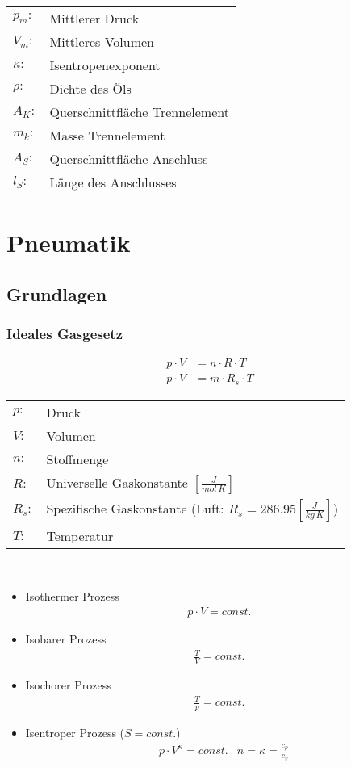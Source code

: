 \documentclass[landscape,a4paper,10pt]{article}
\begin{document}
\begin{multicols*}{3}
\begin{tabular}{ll}
$p_m:$ & Mittlerer Druck \\
$V_m:$ & Mittleres Volumen \\
$\kappa:$ & Isentropenexponent \\
$\rho:$ & Dichte des Öls \\
$A_K:$ & Querschnittfläche Trennelement \\
$m_k:$ & Masse Trennelement \\
$A_S:$ & Querschnittfläche Anschluss \\
$l_S:$ & Länge des Anschlusses
\end{tabular}







\vfill
\columnbreak
\section{Pneumatik}
\subsection{Grundlagen}
\subsubsection{Ideales Gasgesetz}
\begin{align*}
p\cdot V  &= n \cdot R \cdot T \\
p \cdot V &= m \cdot R_s \cdot T
\end{align*}
\begin{tabular}{ll}
$p:$ & Druck \\
$V:$ & Volumen \\
$n:$ & Stoffmenge \\
$R:$ & Universelle Gaskonstante $[\frac{J}{mol \, K}]$ \\
$R_s:$ & Spezifische Gaskonstante (Luft: $R_s = 286.95 [\frac{J}{kg \, K}]$) \\
$T:$ & Temperatur
\end{tabular} \\

\begin{itemize}
\item Isothermer Prozess
\begin{align*}
p \cdot V = const.
\end{align*}
\item Isobarer Prozess
\begin{align*}
\frac{T}{V} = const. 
\end{align*}
\item Isochorer Prozess
\begin{align*}
\frac{T}{p} = const.
\end{align*}
\item Isentroper Prozess ($S=const.$)
\begin{align*}
&p\cdot V^\kappa = const.
&n=  \kappa = \frac{c_p}{c_v}
\end{align*}
\end{itemize}


\end{multicols*}
\end{document}
